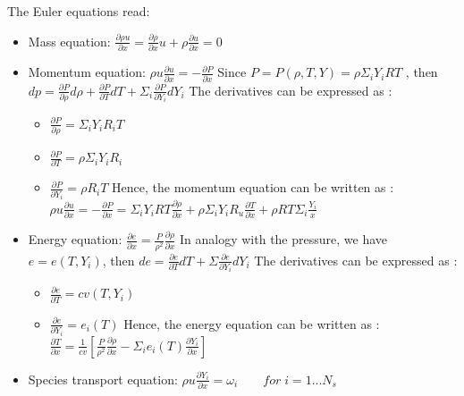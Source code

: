 \documentclass[letterpaper,10pt,english]{jupyterBook}
\begin{document}
\sphinxAtStartPar
The Euler equations read:
\begin{itemize}
\item {} 
\sphinxAtStartPar
Mass equation: 
\( \frac{\partial \rho u}{\partial x} = \frac{\partial \rho}{\partial x}u + \rho \frac{\partial u}{\partial x} = 0\)

\item {} 
\sphinxAtStartPar
Momentum equation: 
\( \rho u \frac{\partial u}{\partial x} = - \frac{\partial P}{\partial x} \) 
Since \( P = P(\rho, T, Y) = \rho \Sigma_i Y_i R T \) , then \( dp = \frac{\partial P}{\partial \rho} d \rho + \frac{\partial P}{\partial T} d T + \Sigma_i \frac{\partial P}{\partial Y_i} d Y_i \)  
The derivatives can be expressed as : 
\begin{itemize}
\item {} 
\sphinxAtStartPar
\( \frac{\partial P}{\partial \rho} = \Sigma_i Y_i R_i T \) 

\item {} 
\sphinxAtStartPar
\( \frac{\partial P}{\partial T} = \rho \Sigma_i Y_i R_i\) 

\item {} 
\sphinxAtStartPar
\( \frac{\partial P}{\partial Y_i} = \rho R_i T\) 
Hence, the momentum equation can be written as : 
\( \rho u \frac{\partial u}{\partial x} = - \frac{\partial P}{\partial x} = \Sigma_i Y_i R T \frac{\partial \rho}{\partial x} + \rho \Sigma_i Y_i R_u \frac{\partial T}{\partial x} + \rho R T \Sigma_i \frac{Y_i}{x}\)

\end{itemize}

\item {} 
\sphinxAtStartPar
Energy equation: 
\( \frac{\partial e}{\partial x} = \frac{P}{\rho^2} \frac{\partial \rho}{\partial x}\) 
In analogy with the pressure, we have \( e = e (T, Y_i) \), then \( de = \frac{\partial e }{\partial T} dT + \Sigma \frac{\partial e }{\partial Y_i} dY_i\) 
The derivatives can be expressed as : 
\begin{itemize}
\item {} 
\sphinxAtStartPar
\( \frac{\partial e}{\partial T} = cv(T, Y_i) \) 

\item {} 
\sphinxAtStartPar
\( \frac{\partial e}{\partial Y_i} = e_i(T) \) 
Hence, the energy equation can be written as : 
\( \frac{\partial T}{\partial x} = \frac{1}{cv} \left[ \frac{P}{\rho^2} \frac{\partial \rho}{\partial x} - \Sigma_i e_i(T) \frac{\partial Y_i}{\partial x} \right] \)

\end{itemize}

\item {} 
\sphinxAtStartPar
Species transport equation: 
\( \rho u \frac{\partial Y_i }{\partial x} = \omega_i \qquad for \; i = 1 ... N_s \)

\end{itemize}
\end{document}

